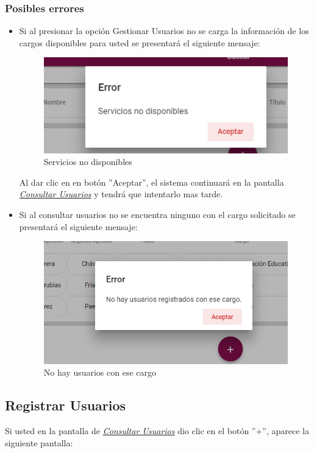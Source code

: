 \subsubsection{Posibles errores}
\begin{itemize}
	\item Si al  presionar la opción Gestionar Usuarios no se carga la información de los cargos disponibles para usted se presentará el siguiente mensaje:

	\begin{figure}[H]
		\centering
		\includegraphics[width=0.4\linewidth]{images/SP5/MSGSN}
		\caption{Servicios no disponibles}
		\label{SND}

	\end{figure}

	Al dar clic en en botón ''Aceptar'', el sistema continuará en la pantalla  \hyperlink{consultarUs}{\textit{Consultar Usuarios}} y tendrá que intentarlo  mas tarde.

	\item Si al consultar usuarios no se encuentra ninguno con el cargo solicitado se presentará el siguiente mensaje:
	\begin{figure}[H]
		\centering
		\includegraphics[width=0.4\linewidth]{images/SP5/MSG21}
		\caption{No hay usuarios con ese cargo}
		\label{mensaje21}
	\end{figure}

\end{itemize}


\newpage
\hypertarget{registrarUs}{}
\subsection{Registrar Usuarios}
Si usted  en la pantalla de \hyperlink{consultarUs}{\textit{Consultar Usuarios}} dio clic en el botón ''+'', aparece la siguiente pantalla:

